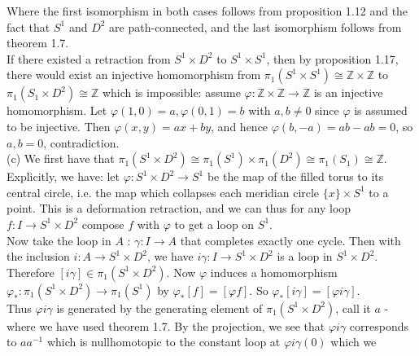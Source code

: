 \documentclass[a4paper]{article}
\begin{document}
    Where the first isomorphism in both cases follows from proposition 1.12 and the fact that
    $S^{1}$ and $D^2$ are path-connected, and the last isomorphism follows from
    theorem 1.7.\\
    If there existed a retraction from $S^{1}\times D^2$ to $S^{1}\times
    S^{1}$, then by proposition 1.17, there would exist an injective
    homomorphism from $\pi_1 \left( S^{1}\times S^{1} \right) \cong \mathbb{Z}
    \times \mathbb{Z}$ to
    $\pi_1 \left( S_1 \times D^2 \right) \cong \mathbb{Z}$ which is impossible:
    assume $\varphi  \colon \mathbb{Z} \times \mathbb{Z} \to \mathbb{Z}$ is an
    injective homomorphism. 
    Let $\varphi(1,0) = a, \varphi(0,1) = b$ with $a,b \neq 0$ since
    $\varphi$ is assumed to be injective. Then
    $\varphi (x,y) = ax + by$, and hence $\varphi(b,-a) = ab - ab = 0$, so 
    $a,b = 0$, contradiction.\\
    \linebreak
    (c) We first have that
    $\pi_1 \left( S^{1} \times D^2 \right) 
    \cong \pi_1 \left( S^{1} \right) \times \pi_1 \left( D^2 \right)  
    \cong \pi_1 \left( S_1 \right) \cong \mathbb{Z}$.\\
    Explicitly, we have:
    let $\varphi  \colon S^{1} \times D^2 \to S^{1}$ be the map of
    the filled torus to its central circle, i.e. the map which collapses each
    meridian circle
    $\{x\} \times S^{1} $ to a point. This is a deformation retraction,
    and we can thus for any loop $f  \colon I \to S^{1} \times D^2$
    compose $f$ with $\varphi$ to get a loop on
    $S^{1}$.\\
    Now take the
    loop in $A$ : $\gamma  \colon I \to A$ that completes exactly one cycle. Then
    with the inclusion $i  \colon A \to S^{1} \times D^2$, we
     have $i \gamma  \colon I \to S^{1} \times D^2$ is a loop in
     $S^{1} \times D^2$. Therefore
     $\left[ i \gamma \right] \in  \pi_1 \left( S^{1}\times D^2 \right) $.
     Now $\varphi$ induces a homomorphism $\varphi_*  \colon \pi_1 \left(
     S^{1}\times D^2 \right) \to \pi_1 \left( S^{1} \right)$ by
     $\varphi_* \left[ f \right] = \left[ \varphi f \right] $. So
     $\varphi_* \left[ i \gamma \right] = \left[ \varphi i \gamma \right] $.\\
     Thus $\varphi i \gamma$ is generated by the generating element
     of $\pi_1 \left( S^{1} \times D^2 \right) $, call it $a$ - where we have
     used theorem 1.7. By the
     projection, we see that $\varphi i \gamma$ corresponds to $a a^{-1}$ which
     is nullhomotopic to the constant loop at  $\varphi i \gamma (0)$ which we
\end{document}
